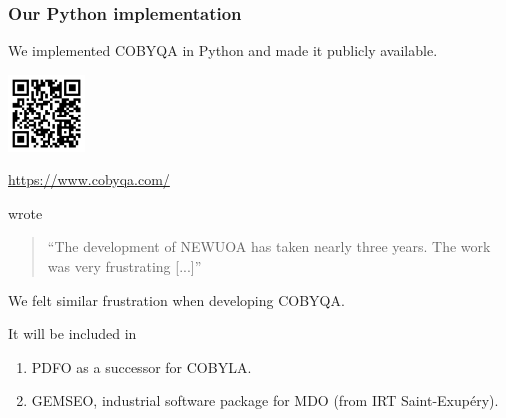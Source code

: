 \documentclass{polyu-presentation}
\begin{document}
\begin{frame}
    \frametitle{Our Python implementation}

    We implemented COBYQA in \alert{Python} and made it \alert{publicly available}.
    
	\begin{center}
        \href{https://www.cobyqa.com/}{\includegraphics[width=0.8in]{images/qr/cobyqa.png}}

        \scriptsize\url{https://www.cobyqa.com/}
    \end{center}

    \begin{block}{}
        \textcite{Powell_2006} wrote
        \begin{quote}
            \enquote{The development of NEWUOA has taken nearly three years. The work was very frustrating [...]}
        \end{quote}
        We felt similar frustration when developing COBYQA.
    \end{block}

    It will be included in
    \begin{enumerate}
        \item PDFO as a successor for COBYLA.
        \item GEMSEO, industrial software package for MDO (from IRT Saint-Exup{\'{e}}ry).
    \end{enumerate}
\end{frame}
\end{document}
